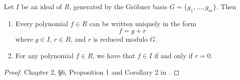 \begin{comment}
\begin{theorem}
  \label{thm_groebner_basis_product}
  Let $I$ and $J$ be ideals of $R = K[x_1, \ldots, x_n]$, generated by Gr\"obner bases, say
  \begin{align*}
    I &= \pid{f_1, \ldots, f_m} \\
    J &= \pid{g_1, \ldots, g_n}.
  \end{align*}
  Then
  \[ \{ f_ig_j ~|~ 1 \leq i \leq m, 1 \leq j \leq n \} \]
  is a Gr\"obner basis for the ideal product $IJ$.
\end{theorem}
\begin{proof}
  \begin{align*}
    \LT(IJ)
      &= \pid{ \LT(h) ~|~ h \in IJ } \\
      &= \pid{ \LT(fg) ~|~ f \in I, g \in J } \\
      &= \pid{ \LT(f)\LT(g) ~|~ f \in I, g \in J } \\
      &= \pid{ \LT(f) ~|~ f \in I } \pid{ \LT(g) ~|~ g \in J } \\
      &= \LT(I) \LT(J) \\
      &= \pid{ \LT(f_i) ~|~ 1 \leq i \leq m } \pid{ \LT(g_j) ~|~ 1 \leq j \leq n } \\
      &= \pid{ \LT(f_i) \LT(g_j) ~|~ 1 \leq i \leq m, 1 \leq j \leq n } \\
      &= \pid{ \LT(f_i g_j) ~|~ 1 \leq i \leq m, 1 \leq j \leq n }
  \end{align*}
\end{proof}
\end{comment}

\begin{theorem}
  \label{thm_groebner_basis_remainder}
  Let $I$ be an ideal of $R$, generated by the Gr\"obner basis $G = \{ g_1, \ldots, g_m \}$. Then
  \begin{enumerate}[label=(\roman*)]
    \item
    Every polynomial $f \in R$ can be written uniquely in the form
    \begin{equation*}
      f = g + r
    \end{equation*}
    where $g \in I$, $r \in R$, and $r$ is reduced modulo $G$.

    \item
    For any polynomial $f \in R$, we have that $f \in I$ if and only if $r = 0$.
  \end{enumerate}
\end{theorem}
\begin{proof}
  Chapter 2, \S 6, Proposition 1 and Corollary 2 in \cite{cox07}.
\end{proof}

